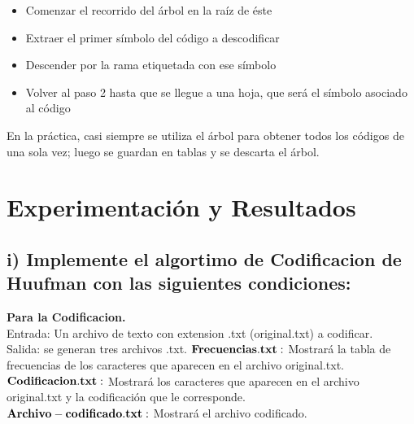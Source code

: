 \documentclass[spanish]{article}
\begin{document}
\begin{itemize}
	\item Comenzar el recorrido del árbol en la raíz de éste
	\item Extraer el primer símbolo del código a descodificar
	\item Descender por la rama etiquetada con ese símbolo
	\item Volver al paso 2 hasta que se llegue a una hoja, que será el símbolo asociado al código
\end{itemize}

En la práctica, casi siempre se utiliza el árbol para obtener todos los códigos de una sola vez; luego se guardan en tablas y se descarta el árbol.

	\newpage	

	\section{Experimentaci\'on y Resultados}
	
	\subsection{ i) Implemente el algortimo de Codificacion de Huufman con las siguientes condiciones:}
	
	{\large{ {{\bf Para la Codificacion.} }}}\\
	Entrada: Un archivo de texto con extension .txt (original.txt) a codificar.\\
	Salida: se generan tres archivos .txt.
	${\bf Frecuencias.txt:}$ Mostrará la tabla de frecuencias de los caracteres que aparecen en el archivo original.txt.\\
		 	${\bf Codificacion.txt:}$ Mostrará los caracteres que aparecen en el archivo original.txt y la codificación que le corresponde.\\
\bigskip		 	${\bf Archivo-codificado.txt:}$ Mostrará el archivo codificado.\\
\end{document}
